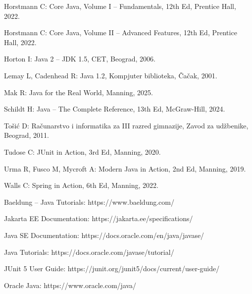 Horstmann C: Core Java, Volume I – Fundamentals, 12th Ed, Prentice Hall, 2022.

Horstmann C: Core Java, Volume II – Advanced Features, 12th Ed, Prentice Hall, 2022.

Horton I: Java 2 – JDK 1.5, CET, Beograd, 2006.

Lemay L, Cadenhead R: Java 1.2, Kompjuter biblioteka, Čačak, 2001.

Mak R: Java for the Real World, Manning, 2025.

Schildt H: Java – The Complete Reference, 13th Ed, McGraw-Hill, 2024.

Tošić D: Računarstvo i informatika za III razred gimnazije, Zavod za udžbenike, Beograd, 2011.

Tudose C: JUnit in Action, 3rd Ed, Manning, 2020.

Urma R, Fusco M, Mycroft A: Modern Java in Action, 2nd Ed, Manning, 2019.

Walls C: Spring in Action, 6th Ed, Manning, 2022.


Baeldung – Java Tutorials: https://www.baeldung.com/

Jakarta EE Documentation: https://jakarta.ee/specifications/

Java SE Documentation: https://docs.oracle.com/en/java/javase/

Java Tutorials: https://docs.oracle.com/javase/tutorial/

JUnit 5 User Guide:  https://junit.org/junit5/docs/current/user-guide/

Oracle Java: https://www.oracle.com/java/
